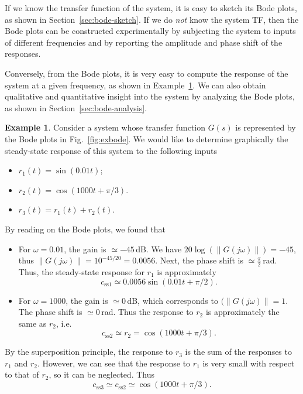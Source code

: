 \documentclass[a4paper,11pt]{report}
\theoremstyle{definition}
\newtheorem{mdexample}{Example}
\newenvironment{example}%
  {\vspace{0.1cm}\begin{mdframed}[backgroundcolor=lightgray]\begin{mdexample}}%
  {\end{mdexample}\end{mdframed}\vspace{0.1cm}}
\begin{document}
If we know the transfer function of the system, it is easy to sketch
its Bode plots, as shown in Section~\ref{sec:bode-sketch}. If we do
\emph{not} know the system TF, then the Bode plots can be constructed
experimentally by subjecting the system to inputs of different
frequencies and by reporting the amplitude and phase shift of the
responses.

Conversely, from the Bode plots, it is very easy to compute the
response of the system at a given frequency, as shown in
Example~\ref{ex:bode}. We can also obtain qualitative and quantitative
insight into the system by analyzing the Bode plots, as shown in
Section~\ref{sec:bode-analysis}.

\begin{example}
  \label{ex:bode}
  Consider a system whose transfer function $G(s)$ is represented by
  the Bode plots in Fig.~\ref{fig:exbode}. We would like to determine
  graphically the steady-state response of this system to the
  following inputs
  \begin{itemize}
  \item $r_1(t) = \sin(0.01t)$;
  \item $r_2(t) = \cos(1000t+\pi/3)$.
  \item $r_3(t) = r_1(t) + r_2(t)$.
  \end{itemize}
  
  By reading on the Bode plots, we found that
  \begin{itemize}
  \item For $\omega=0.01$, the gain is  $\simeq-45$\,dB. We have
    $20\log(\|G(j\omega)\|) = -45$, thus $\|G(j\omega)\|=10^{-45/20} =
    0.0056$. Next, the phase shift is $\simeq\frac{\pi}{2}$\,rad. Thus,
    the steady-state response for $r_1$ is approximately
    \[
    c_\mathrm{ss1} \simeq 0.0056\sin(0.01t+\pi/2).
    \]
  \item For $\omega=1000$, the gain is $\simeq0$\,dB, which
    corresponds to $(\|G(j\omega)\|=1$. The phase shift is
    $\simeq0$\,rad. Thus the response to $r_2$ is approximately the
    same as $r_2$, i.e.
    \[
    c_\mathrm{ss2} \simeq r_2=\cos(1000t+\pi/3).
    \]
  \end{itemize}

  By the superposition principle, the response to $r_3$ is the sum of
  the responses to $r_1$ and $r_2$. However, we can see that the
  response to $r_1$ is very small with respect to that of $r_2$, so it
  can be neglected. Thus
  \[
  c_\mathrm{ss3} \simeq c_\mathrm{ss2} \simeq \cos(1000t+\pi/3).
  \]
  

\end{example}
\end{document}
